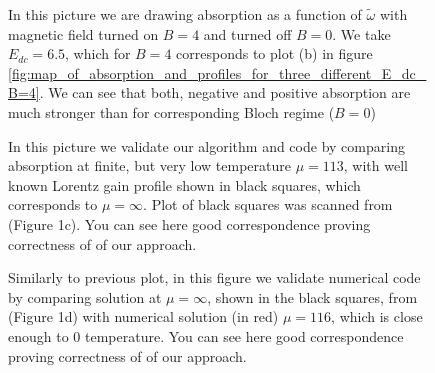 \documentclass[40pt,letterpaper,physrev]{article}
\begin{document}
	\newpage
	\begin{figure}[H]
	  \centering
	  \normalsize %
	  
	  \label{fig:cycl_vs_bloch_gain}
	  \caption{In this picture we are drawing absorption as a function of $\tilde{\omega}$ with magnetic field turned on
	  $B = 4$ and turned off $B = 0$. We take $E_{dc} = 6.5$, which for $B = 4$ corresponds to plot (b) in figure 
	  \ref{fig:map_of_absorption_and_profiles_for_three_different_E_dc_B=4}. We can see that both, negative and 
	  positive absorption are much stronger than for corresponding Bloch regime ($B = 0$)}
	\end{figure}	
	\newpage
	\begin{figure}[H]
	  \centering
	  \normalsize %
	  
	  \label{fig:lorentz_gain}
	  \caption{In this picture we validate our algorithm and code by comparing absorption at finite, but very low 
	  temperature $\mu = 113$, with well known Lorentz gain profile shown in black squares, which corresponds 
	  to $\mu = \infty$. Plot of black squares was scanned from \cite{PhysRevLett.103.117401} (Figure 1c). 
	  You can see here good correspondence proving correctness of of our approach.}
	\end{figure}	
	\begin{figure}[H]
	  \centering
	  \normalsize %
	  
	  \label{fig:gain_at_E_dc=6}
	  \caption{Similarly to previous plot, in this figure we validate numerical code by comparing solution 
	  at $\mu = \infty$, shown in the black squares, from \cite{PhysRevLett.103.117401} (Figure 1d) with 
	  numerical solution (in red) $\mu = 116$, which is close enough to 0 temperature. You can see here good
	  correspondence proving correctness of of our approach.}
	\end{figure}
\end{document}
